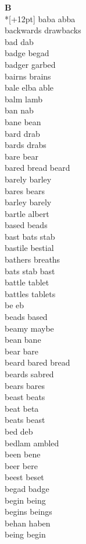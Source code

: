 \vspace{14pt}
\noindent\textbf{\Large B}\\*[+12pt]
baba abba\\
backwards drawbacks\\
bad dab\\
badge begad\\
badger garbed\\
bairns brains\\
bale elba able\\
balm lamb\\
ban nab\\
bane bean\\
bard drab\\
bards drabs\\
bare bear\\
bared bread beard\\
barely barley\\
bares bears\\
barley barely\\
bartle albert\\
based beads\\
bast bats stab\\
bastile bestial\\
bathers breaths\\
bats stab bast\\
battle tablet\\
battles tablets\\
be eb\\
beads based\\
beamy maybe\\
bean bane\\
bear bare\\
beard bared bread\\
beards sabred\\
bears bares\\
beast beats\\
beat beta\\
beats beast\\
bed deb\\
bedlam ambled\\
been bene\\
beer bere\\
beest beset\\
begad badge\\
begin being\\
begins beings\\
behan haben\\
being begin\\
